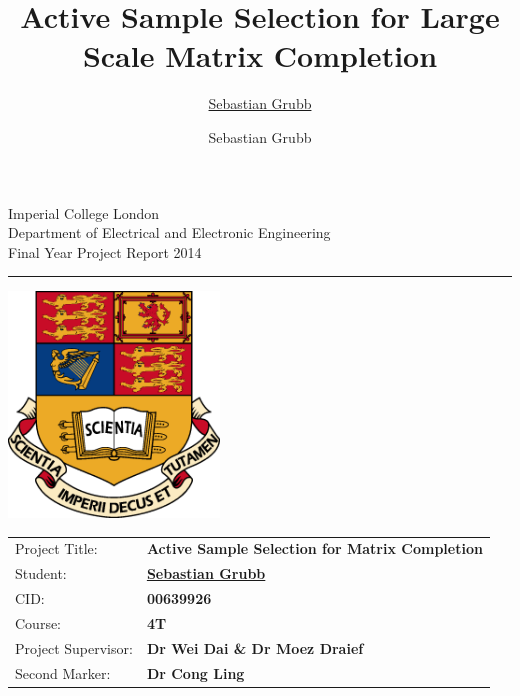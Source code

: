 \documentclass[oneside,11pt]{Classes/CUEDthesisPSnPDF}
\title{Active Sample Selection for Large Scale Matrix Completion}
\author{\href{mailto:sg3510@ic.ac.uk}{Sebastian Grubb}}
\author{Sebastian Grubb}
\newcounter{col}
\begin{document}
\begin{titlepage}
\setlength{\parindent}{0pt}
\setlength{\parskip}{0pt}

{
\Large
\raggedright
Imperial College London\\[12pt]
Department of Electrical and Electronic Engineering\\[12pt]
Final Year Project Report 2014\\[12pt]

}
\rule{\columnwidth}{3pt}

\vfill

\centering
\includegraphics[width=0.6\columnwidth,height=60mm,keepaspectratio]{ThesisFigs/imperial_crest.eps}

\vfill

\setlength{\tabcolsep}{0pt}
\begin{tabular}{p{40mm}p{\dimexpr\columnwidth-40mm}}
Project Title: & \textbf{Active Sample Selection for Matrix Completion} \\[12pt]
Student: & \textbf{\href{mailto:sg3510@ic.ac.uk}{Sebastian Grubb}} \\[12pt]
CID: & \textbf{00639926} \\[12pt]
Course: & \textbf{4T} \\[12pt]
Project Supervisor: & \textbf{Dr Wei Dai \& Dr Moez Draief} \\[12pt]
Second Marker: & \textbf{Dr Cong Ling} \\
\end{tabular}
\end{titlepage}

%   
\end{document}
